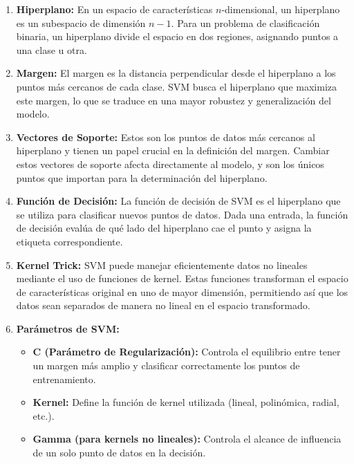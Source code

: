 \documentclass[12pt]{article}
\begin{document}
\begin{enumerate}
    \item \textbf{Hiperplano:}
        En un espacio de características $n$-dimensional, un hiperplano es un subespacio de dimensión $n-1$. Para un problema de clasificación binaria, un hiperplano divide el espacio en dos regiones, asignando puntos a una clase u otra.

    \item \textbf{Margen:}
        El margen es la distancia perpendicular desde el hiperplano a los puntos más cercanos de cada clase. SVM busca el hiperplano que maximiza este margen, lo que se traduce en una mayor robustez y generalización del modelo.

    \item \textbf{Vectores de Soporte:}
        Estos son los puntos de datos más cercanos al hiperplano y tienen un papel crucial en la definición del margen. Cambiar estos vectores de soporte afecta directamente al modelo, y son los únicos puntos que importan para la determinación del hiperplano.

    \item \textbf{Función de Decisión:}
        La función de decisión de SVM es el hiperplano que se utiliza para clasificar nuevos puntos de datos. Dada una entrada, la función de decisión evalúa de qué lado del hiperplano cae el punto y asigna la etiqueta correspondiente.

    \item \textbf{Kernel Trick:}
        SVM puede manejar eficientemente datos no lineales mediante el uso de funciones de kernel. Estas funciones transforman el espacio de características original en uno de mayor dimensión, permitiendo así que los datos sean separados de manera no lineal en el espacio transformado.

    \item \textbf{Parámetros de SVM:}
        \begin{itemize}
            \item \textbf{C (Parámetro de Regularización):} Controla el equilibrio entre tener un margen más amplio y clasificar correctamente los puntos de entrenamiento.
            \item \textbf{Kernel:} Define la función de kernel utilizada (lineal, polinómica, radial, etc.).
            \item \textbf{Gamma (para kernels no lineales):} Controla el alcance de influencia de un solo punto de datos en la decisión.
        \end{itemize}


\end{enumerate}
\end{document}
